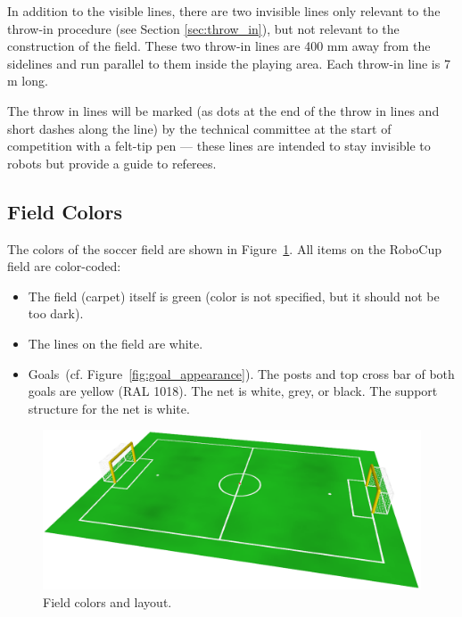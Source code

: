 \documentclass[12pt]{article}
\newcommand{\cf}{\mbox{cf.}\xspace}
\begin{document}
In addition to the visible lines, there are two invisible lines only relevant to the throw-in procedure (see Section \ref{sec:throw_in}), but not relevant to the construction of the field. These two throw-in lines are 400 mm away from the sidelines and run parallel to them inside the playing area.  Each throw-in line is 7 m long.

The throw in lines will be marked (as dots at the end of the throw in lines and short dashes along the line) by the technical committee at the start of competition with a felt-tip pen --- these lines are intended to stay invisible to robots but provide a guide to referees.

\subsection{Field Colors}

The colors of the soccer field are shown in Figure~\ref{fig:field_color}. All items on the RoboCup field are color-coded:

\begin{itemize}

\item The field (carpet) itself is green (color is not specified, but it should not be too dark).

\item The lines on the field are white.

\item Goals~(\cf Figure~\ref{fig:goal_appearance}). The posts and top cross bar of both goals are yellow (RAL 1018). The net is white, grey, or black.  The support structure for the net is white.

\end{itemize}

\begin{figure}[t]
\centerline{\includegraphics[width=\columnwidth]{figs/emptyfield_2014.png}}
\caption{Field colors and layout.}
\label{fig:field_color}
\end{figure}
\end{document}
